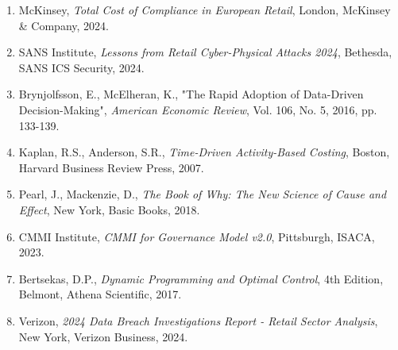 \begin{enumerate}
\item McKinsey, \textit{Total Cost of Compliance in European Retail}, London, McKinsey \& Company, 2024.

\item SANS Institute, \textit{Lessons from Retail Cyber-Physical Attacks 2024}, Bethesda, SANS ICS Security, 2024.

\item Brynjolfsson, E., McElheran, K., "The Rapid Adoption of Data-Driven Decision-Making", \textit{American Economic Review}, Vol. 106, No. 5, 2016, pp. 133-139.

\item Kaplan, R.S., Anderson, S.R., \textit{Time-Driven Activity-Based Costing}, Boston, Harvard Business Review Press, 2007.

\item Pearl, J., Mackenzie, D., \textit{The Book of Why: The New Science of Cause and Effect}, New York, Basic Books, 2018.

\item CMMI Institute, \textit{CMMI for Governance Model v2.0}, Pittsburgh, ISACA, 2023.

\item Bertsekas, D.P., \textit{Dynamic Programming and Optimal Control}, 4th Edition, Belmont, Athena Scientific, 2017.

\item Verizon, \textit{2024 Data Breach Investigations Report - Retail Sector Analysis}, New York, Verizon Business, 2024.
\end{enumerate}